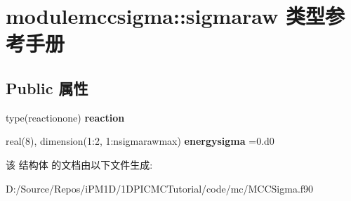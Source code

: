 \hypertarget{structmodulemccsigma_1_1sigmaraw}{}\section{modulemccsigma\+::sigmaraw 类型参考手册}
\label{structmodulemccsigma_1_1sigmaraw}
\subsection*{Public 属性}
\begin{DoxyCompactItemize}
\item 
\mbox{\label{structmodulemccsigma_1_1sigmaraw_abafcd8514acaf4923cacc85caec380bb}} 
type(reactionone) {\bfseries reaction}
\item 
\mbox{\label{structmodulemccsigma_1_1sigmaraw_a778e63df543afda5da0655764877331e}} 
real(8), dimension(1\+:2, 1\+:nsigmarawmax) {\bfseries energysigma} =0.d0
\end{DoxyCompactItemize}


该 结构体 的文档由以下文件生成\+:\begin{DoxyCompactItemize}
\item 
D\+:/\+Source/\+Repos/i\+P\+M1\+D/1\+D\+P\+I\+C\+M\+C\+Tutorial/code/mc/M\+C\+C\+Sigma.\+f90\end{DoxyCompactItemize}
